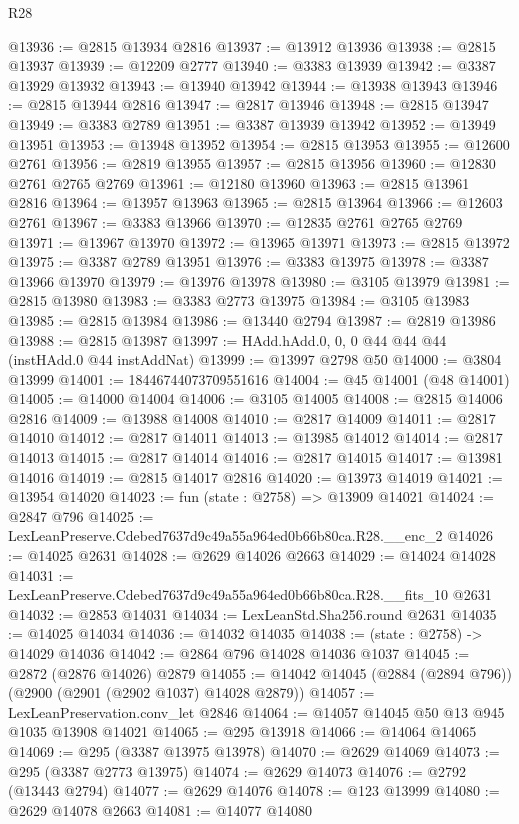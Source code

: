 \begin{lexlean}{R28}
\begin{coremodule}
@13936 := @2815 @13934 @2816
@13937 := @13912 @13936
@13938 := @2815 @13937
@13939 := @12209 @2777
@13940 := @3383 @13939
@13942 := @3387 @13929 @13932
@13943 := @13940 @13942
@13944 := @13938 @13943
@13946 := @2815 @13944 @2816
@13947 := @2817 @13946
@13948 := @2815 @13947
@13949 := @3383 @2789
@13951 := @3387 @13939 @13942
@13952 := @13949 @13951
@13953 := @13948 @13952
@13954 := @2815 @13953
@13955 := @12600 @2761
@13956 := @2819 @13955
@13957 := @2815 @13956
@13960 := @12830 @2761 @2765 @2769
@13961 := @12180 @13960
@13963 := @2815 @13961 @2816
@13964 := @13957 @13963
@13965 := @2815 @13964
@13966 := @12603 @2761
@13967 := @3383 @13966
@13970 := @12835 @2761 @2765 @2769
@13971 := @13967 @13970
@13972 := @13965 @13971
@13973 := @2815 @13972
@13975 := @3387 @2789 @13951
@13976 := @3383 @13975
@13978 := @3387 @13966 @13970
@13979 := @13976 @13978
@13980 := @3105 @13979
@13981 := @2815 @13980
@13983 := @3383 @2773 @13975
@13984 := @3105 @13983
@13985 := @2815 @13984
@13986 := @13440 @2794
@13987 := @2819 @13986
@13988 := @2815 @13987
@13997 := HAdd.hAdd.{0, 0, 0} @44 @44 @44 (instHAdd.{0} @44 instAddNat)
@13999 := @13997 @2798 @50
@14000 := @3804 @13999
@14001 := 18446744073709551616
@14004 := @45 @14001 (@48 @14001)
@14005 := @14000 @14004
@14006 := @3105 @14005
@14008 := @2815 @14006 @2816
@14009 := @13988 @14008
@14010 := @2817 @14009
@14011 := @2817 @14010
@14012 := @2817 @14011
@14013 := @13985 @14012
@14014 := @2817 @14013
@14015 := @2817 @14014
@14016 := @2817 @14015
@14017 := @13981 @14016
@14019 := @2815 @14017 @2816
@14020 := @13973 @14019
@14021 := @13954 @14020
@14023 := fun (state : @2758) => @13909 @14021
@14024 := @2847 @796
@14025 := LexLeanPreserve.Cdebed7637d9c49a55a964ed0b66b80ca.R28.__enc_2
@14026 := @14025 @2631
@14028 := @2629 @14026 @2663
@14029 := @14024 @14028
@14031 := LexLeanPreserve.Cdebed7637d9c49a55a964ed0b66b80ca.R28.__fits_10 @2631
@14032 := @2853 @14031
@14034 := LexLeanStd.Sha256.round @2631
@14035 := @14025 @14034
@14036 := @14032 @14035
@14038 := (state : @2758) -> @14029 @14036
@14042 := @2864 @796 @14028 @14036 @1037
@14045 := @2872 (@2876 @14026) @2879
@14055 := @14042 @14045 (@2884 (@2894 @796)) (@2900 (@2901 (@2902 @1037) @14028 @2879))
@14057 := LexLeanPreservation.conv_let @2846
@14064 := @14057 @14045 @50 @13 @945 @1035 @13908 @14021
@14065 := @295 @13918
@14066 := @14064 @14065
@14069 := @295 (@3387 @13975 @13978)
@14070 := @2629 @14069
@14073 := @295 (@3387 @2773 @13975)
@14074 := @2629 @14073
@14076 := @2792 (@13443 @2794)
@14077 := @2629 @14076
@14078 := @123 @13999
@14080 := @2629 @14078 @2663
@14081 := @14077 @14080

\end{coremodule}
\end{lexlean}

